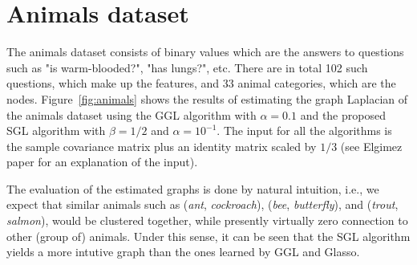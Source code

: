 \section{Animals dataset}

The \textsf{animals} dataset consists of binary values which are the answers to questions such as
"is warm-blooded?", "has lungs?", etc. There are in total 102 such questions, which make up the features, and
33 animal categories, which are the nodes. Figure~\ref{fig:animals} shows the results of estimating the
graph Laplacian of the \textsf{animals} dataset using the \textsf{GGL} algorithm with $\alpha = 0.1$ and
the proposed \textsf{SGL} algorithm with $\beta = 1/2$ and $\alpha = 10^{-1}$. The input for all the algorithms
is the sample covariance matrix plus an identity matrix scaled by $1/3$ (see Elgimez paper for an explanation of
the input).

The evaluation of the estimated graphs is done by natural intuition, i.e., we expect that similar animals
such as (\textit{ant}, \textit{cockroach}), (\textit{bee}, \textit{butterfly}), and
(\textit{trout}, \textit{salmon}), would be clustered together, while presently virtually zero connection to
other (group of) animals. Under this sense, it can be seen that the \textsf{SGL} algorithm yields a more intutive
graph than the ones learned by \textsf{GGL} and \textsf{Glasso}.

